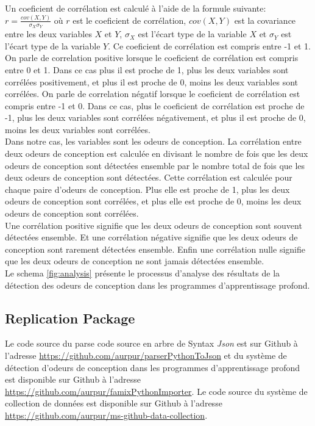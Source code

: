 Un coeficient de corrélation est calculé à l'aide de la formule suivante:  $r =
  \frac{cov(X,Y)}{\sigma_X \sigma_Y}$  où $r$ est le coeficient de corrélation, $cov(X,Y)$ est la covariance entre les
deux variables $X$ et $Y$, $\sigma_X$ est l'écart type de la variable $X$ et
$\sigma_Y$ est l'écart type de la variable $Y$. Ce coeficient de corrélation est
compris entre -1 et 1. On parle de correlation positive lorsque le coeficient de
corrélation est compris entre 0 et 1. Dans ce cas plus il est proche de 1, plus les deux variables sont
corrélées positivement, et plus il est proche de 0, moins les deux variables sont
corrélées. On parle de correlation négatif lorsque le coeficient de corrélation
est compris entre -1 et 0. Dans ce cas, plus le coeficient de corrélation est
proche de -1, plus les deux variables sont corrélées négativement, et plus il
est proche de 0, moins les deux variables sont corrélées.\\



Dans notre cas, les variables sont les odeurs de conception. La corrélation entre deux odeurs de conception est
calculée en divisant le nombre de fois que les deux odeurs de conception sont
détectées ensemble par le nombre total de fois que les deux odeurs de conception
sont détectées. Cette corrélation est calculée pour chaque paire d'odeurs de
conception. Plus elle est proche de 1, plus les deux odeurs de conception sont
corrélées, et plus elle est proche de 0, moins les deux odeurs de conception
sont corrélées.\\

Une corrélation positive signifie que les deux odeurs de conception
sont souvent détectées ensemble. Et une corrélation négative signifie que les deux odeurs de conception sont rarement
détectées ensemble. Enfin une corrélation nulle signifie que les deux odeurs de
conception ne sont jamais détectées ensemble.\\

Le schema \ref{fig:analysis} présente le processus d'analyse des résultats de la
détection des odeurs de conception dans les programmes d'apprentissage
profond.\\

\subsection{Replication Package}
\label{sec:Replication Package}
Le code source du parse code source en arbre de Syntax \emph{Json} est sur
Github à l'adresse \url{https://github.com/aurpur/parserPythonToJson} et du
système de détection d'odeurs de conception dans les programmes d'apprentissage
profond est disponible sur Github à l'adresse
\url{https://github.com/aurpur/famixPythonImporter}. Le code source du système
de collection de données est disponible sur Github à l'adresse
\url{https://github.com/aurpur/ms-github-data-collection}.\\
